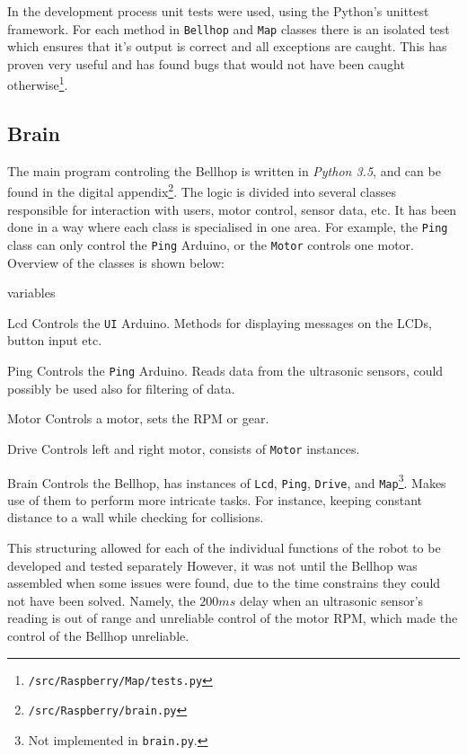 \documentclass[11pt]{article}
\begin{document}
In the development process unit tests were used, using the Python's unittest~\cite{unittest} framework. For each method in \texttt{Bellhop} and \texttt{Map} classes there is an isolated test which ensures that it's output is correct and all exceptions are caught. This has proven very useful and has found bugs that would not have been caught otherwise\footnote{\texttt{/src/Raspberry/Map/tests.py}}.
\subsection*{Brain}
The main program controling the Bellhop is written in \textit{Python 3.5}, and can be found in the digital appendix\footnote{\texttt{/src/Raspberry/brain.py}}. The logic is divided into several classes responsible for interaction with users, motor control, sensor data, etc. It has been done in a way where each class is specialised in one area. For example, the \texttt{Ping} class can only control the \texttt{Ping} Arduino, or the \texttt{Motor} controls one motor. Overview of the classes is shown below:
\begin{labeling}{variables}
\item [Lcd] Controls the \texttt{UI} Arduino. Methods for displaying messages on the LCDs, button input etc.
\item [Ping] Controls the \texttt{Ping} Arduino. Reads data from the ultrasonic sensors, could possibly be used also for filtering of data.
\item [Motor] Controls a motor, sets the RPM or gear.
\item [Drive] Controls left and right motor, consists of \texttt{Motor} instances.
\item [Brain] Controls the Bellhop, has instances of \texttt{Lcd}, \texttt{Ping}, \texttt{Drive}, and \texttt{Map}\footnote{Not implemented in \texttt{brain.py}.}. Makes use of them to perform more intricate tasks. For instance, keeping constant distance to a wall while checking for collisions.
\end{labeling}


This structuring allowed for each of the individual functions of the robot to be developed and tested separately However, it was not until the Bellhop was assembled when some issues were found, due to the time constrains they could not have been solved. Namely, the $200ms$ delay when an ultrasonic sensor's reading is out of range and unreliable control of the motor RPM, which made the control of the Bellhop unreliable.
\end{document}
